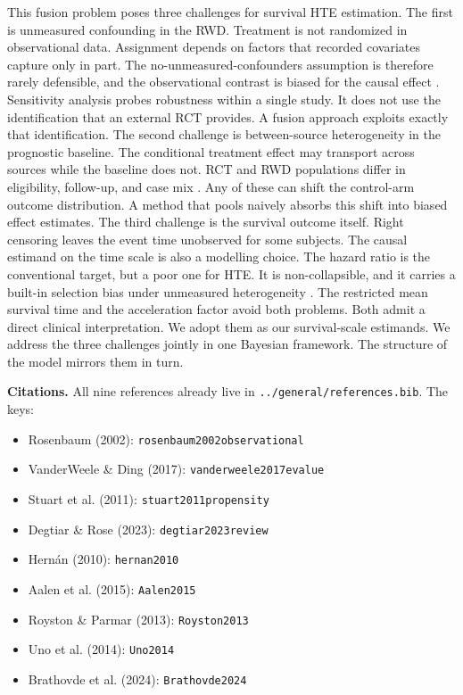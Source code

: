 This fusion problem poses three challenges for survival HTE estimation.
The first is unmeasured confounding in the RWD.
Treatment is not randomized in observational data.
Assignment depends on factors that recorded covariates capture only in part.
The no-unmeasured-confounders assumption is therefore rarely defensible, and the observational contrast is biased for the causal effect \citep{rosenbaum2002observational,vanderweele2017evalue}.
Sensitivity analysis probes robustness within a single study.
It does not use the identification that an external RCT provides.
A fusion approach exploits exactly that identification.
The second challenge is between-source heterogeneity in the prognostic baseline.
The conditional treatment effect may transport across sources while the baseline does not.
RCT and RWD populations differ in eligibility, follow-up, and case mix \citep{stuart2011propensity,degtiar2023review}.
Any of these can shift the control-arm outcome distribution.
A method that pools naively absorbs this shift into biased effect estimates.
The third challenge is the survival outcome itself.
Right censoring leaves the event time unobserved for some subjects.
The causal estimand on the time scale is also a modelling choice.
The hazard ratio is the conventional target, but a poor one for HTE.
It is non-collapsible, and it carries a built-in selection bias under unmeasured heterogeneity \citep{hernan2010,Aalen2015}.
The restricted mean survival time \citep{Royston2013,Uno2014} and the acceleration factor \citep{Brathovde2024} avoid both problems.
Both admit a direct clinical interpretation.
We adopt them as our survival-scale estimands.
We address the three challenges jointly in one Bayesian framework.
The structure of the model mirrors them in turn.

\textbf{Citations.} All nine references already live in \texttt{../general/references.bib}.
The keys:
\begin{itemize}
    \item Rosenbaum (2002): \texttt{rosenbaum2002observational}
    \item VanderWeele \& Ding (2017): \texttt{vanderweele2017evalue}
    \item Stuart et al. (2011): \texttt{stuart2011propensity}
    \item Degtiar \& Rose (2023): \texttt{degtiar2023review}
    \item Hern\'an (2010): \texttt{hernan2010}
    \item Aalen et al. (2015): \texttt{Aalen2015}
    \item Royston \& Parmar (2013): \texttt{Royston2013}
    \item Uno et al. (2014): \texttt{Uno2014}
    \item Brathovde et al. (2024): \texttt{Brathovde2024}
\end{itemize}

